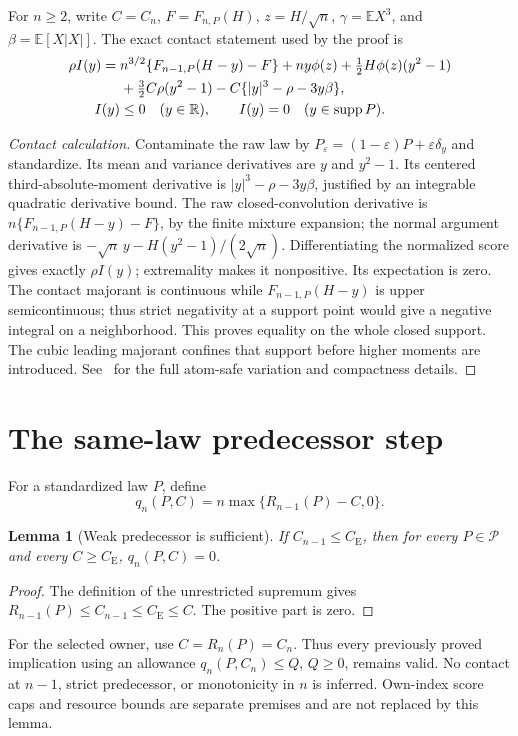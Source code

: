 \documentclass[11pt,a4paper]{article}
\newtheorem{lemma}[theorem]{Lemma}
\newcommand{\E}{\mathbb E}
\newcommand{\R}{\mathbb R}
\newcommand{\CE}{C_{\mathrm E}}
\newcommand{\supp}{\operatorname{supp}}
\begin{document}
For \(n\ge2\), write \(C=C_n\), \(F=F_{n,P}(H)\),
\(z=H/\sqrt n\), \(\gamma=\E X^3\), and \(\beta=\E[X|X|]\).
The exact contact statement used by the proof is
\begin{align}
 \rho I(y)={}&n^{3/2}\{F_{n-1,P}(H-y)-F\}
      +ny\phi(z)+\tfrac12H\phi(z)(y^2-1)\notag\\
 &+\tfrac32C\rho(y^2-1)
      -C\{|y|^3-\rho-3y\beta\},                  \label{eq:contact}\\
 I(y)&\le0\quad(y\in\R),\qquad
 I(y)=0\quad(y\in\supp P).                     \label{eq:contact-zero}
\end{align}
\begin{proof}[Contact calculation]
Contaminate the raw law by $P_\varepsilon=(1-\varepsilon)P+
\varepsilon\delta_y$ and standardize. Its mean and variance derivatives
are $y$ and $y^2-1$. Its centered third-absolute-moment derivative is
$|y|^3-\rho-3y\beta$, justified by an integrable quadratic derivative bound.
The raw closed-convolution derivative is
$n\{F_{n-1,P}(H-y)-F\}$, by the finite mixture expansion; the normal
argument derivative is $-\sqrt n\,y-H(y^2-1)/(2\sqrt n)$.
Differentiating the normalized score gives exactly $\rho I(y)$;
extremality makes it nonpositive. Its expectation is zero. The contact
majorant is continuous while $F_{n-1,P}(H-y)$ is upper semicontinuous;
thus strict negativity at a support point would give a negative integral
on a neighborhood. This proves equality on the whole closed support.
The cubic leading majorant confines that support before higher moments
are introduced. See~\cite[lines410--463]{source} for the full atom-safe
variation and compactness details.
\end{proof}

\section{The same-law predecessor step}\label{sec:predecessor}
For a standardized law \(P\), define
\[
 q_n(P,C)=n\max\{R_{n-1}(P)-C,0\}.
\]
\begin{lemma}[Weak predecessor is sufficient]\label{lem:qzero}
If \(C_{n-1}\le\CE\), then for every \(P\in\mathcal P\) and every
\(C\ge\CE\), \(q_n(P,C)=0\).
\end{lemma}
\begin{proof}
The definition of the unrestricted supremum gives
\(R_{n-1}(P)\le C_{n-1}\le\CE\le C\). The positive part is zero.
\end{proof}
For the selected owner, use \(C=R_n(P)=C_n\). Thus every previously proved
implication using an allowance \(q_n(P,C_n)\le Q\), \(Q\ge0\), remains valid.
No contact at \(n-1\), strict predecessor, or monotonicity in \(n\) is inferred.
Own-index score caps and resource bounds are separate premises and are not
replaced by this lemma.
\end{document}
